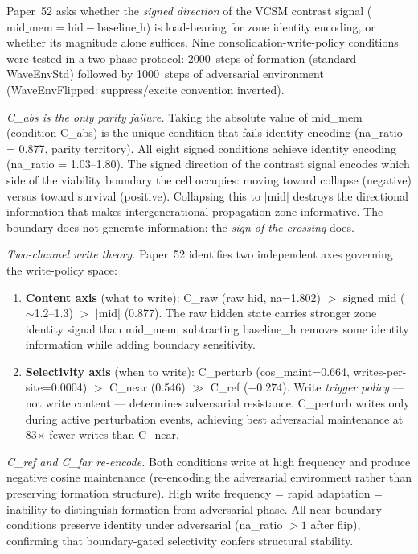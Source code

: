 \documentclass[11pt]{article}
\begin{document}
Paper~52 asks whether the \emph{signed direction} of the VCSM contrast signal
($\mathrm{mid\_mem} = \mathrm{hid} - \mathrm{baseline\_h}$) is load-bearing for
zone identity encoding, or whether its magnitude alone suffices.
Nine consolidation-write-policy conditions were tested in a two-phase protocol:
2000~steps of formation (standard WaveEnvStd) followed by 1000~steps of adversarial
environment (WaveEnvFlipped: suppress/excite convention inverted).

\textit{C\_abs is the only parity failure.}
Taking the absolute value of mid\_mem (condition C\_abs) is the unique condition that
fails identity encoding (na\_ratio = 0.877, parity territory).
All eight signed conditions achieve identity encoding (na\_ratio = 1.03--1.80).
The signed direction of the contrast signal encodes which side of the viability
boundary the cell occupies: moving toward collapse (negative) versus toward survival
(positive).
Collapsing this to $|\mathrm{mid}|$ destroys the directional information that makes
intergenerational propagation zone-informative.
The boundary does not generate information; the \emph{sign of the crossing} does.

\textit{Two-channel write theory.}
Paper~52 identifies two independent axes governing the write-policy space:

\begin{enumerate}
  \item \textbf{Content axis} (what to write):
    C\_raw (raw hid, na=1.802) $>$ signed mid ($\sim$1.2--1.3) $>$ $|$mid$|$ (0.877).
    The raw hidden state carries stronger zone identity signal than mid\_mem;
    subtracting baseline\_h removes some identity information while adding
    boundary sensitivity.
  \item \textbf{Selectivity axis} (when to write):
    C\_perturb (cos\_maint=0.664, writes-per-site=0.0004) $>$ C\_near (0.546) $\gg$
    C\_ref ($-0.274$).
    Write \emph{trigger policy} --- not write content --- determines adversarial resistance.
    C\_perturb writes only during active perturbation events, achieving best adversarial
    maintenance at 83$\times$ fewer writes than C\_near.
\end{enumerate}

\textit{C\_ref and C\_far re-encode.}
Both conditions write at high frequency and produce negative cosine maintenance
(re-encoding the adversarial environment rather than preserving formation structure).
High write frequency = rapid adaptation = inability to distinguish formation from
adversarial phase.
All near-boundary conditions preserve identity under adversarial (na\_ratio $> 1$
after flip), confirming that boundary-gated selectivity confers structural stability.
\end{document}
